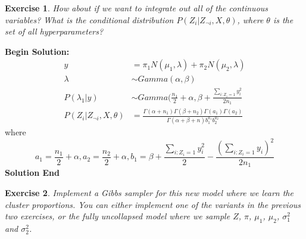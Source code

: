 \documentclass[twoside]{article}
\newcounter{lecnum}
\newtheorem{exercise}{Exercise}[lecnum]
\begin{document}
\begin{exercise}
  How about if we want to integrate out all of the continuous variables? What is the conditional distribution $P(Z_i|Z_{\neg i}, X, \theta)$, where $\theta$ is the set of all hyperparameters?
\end{exercise}

\textbf{Begin Solution:}
\begin{equation*}
\begin{split}
y &= \pi_1 N(\mu_1,\lambda) + \pi_2 N(\mu_2,\lambda)\\
\lambda &\sim Gamma(\alpha,\beta)\\
P(\lambda_1|y)&\sim Gamma(\frac{n_1}{2}+\alpha,\beta+\frac{\sum_{i:Z_i=1}y_i^2}{2n_1}\\
P(Z_i|Z_{\neg i},X,\theta) &= \frac{\Gamma(\alpha+n_1)\Gamma(\beta+n_2)\Gamma(a_1)\Gamma(a_2)}{\Gamma(\alpha+\beta+n)b_1^{a_1}b_2^{a_2}}
\end{split}
\end{equation*}
where
$$a_1 = \frac{n_1}{2}+\alpha,a_2 = \frac{n_2}{2}+\alpha,b_1=\beta + \frac{\sum_{i:Z_i=1}y_i^2}{2}-\frac{(\sum_{i:Z_i=1}y_i)^2}{2n_1}$$
\textbf{Solution End}

\begin{exercise}
  Implement a Gibbs sampler for this new model where we learn the cluster proportions. You can either implement one of the variants in the previous two exercises, or the fully uncollapsed model where we sample $Z$, $\pi$, $\mu_1$, $\mu_2$, $\sigma^2_1$ and $\sigma^2_2$.
\end{exercise}
\end{document}
